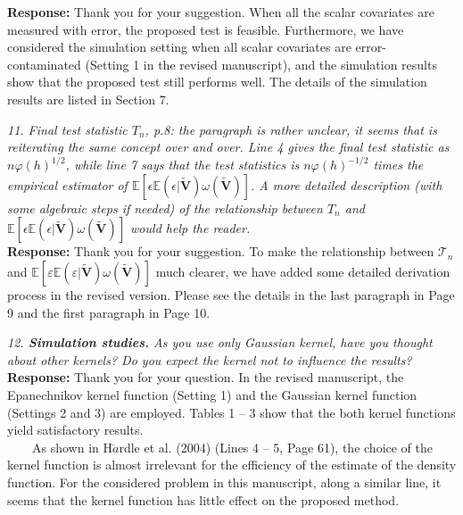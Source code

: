 \documentclass[12pt]{report}
\begin{document}
\begin{description}
{ \bf Response: }  Thank you for your suggestion.  When all the scalar covariates are measured with error, the proposed test is feasible.
Furthermore, we have considered the simulation setting when all scalar covariates are error-contaminated (Setting 1 in the revised manuscript), and the simulation results show that the proposed test still performs well.
The details of the simulation results are listed in Section 7.\\

\item {{ \textcolor[rgb]{0.00,0.50,1.00}{\em 11. Final test statistic $T_n$, p.8: the paragraph is rather unclear, it seems that is reiterating the
same concept over and over. Line 4 gives the final test statistic as $n \varphi(h)^{1/2}$, while line 7 says
that the test statistics is $n \varphi(h)^{-1/2}$ times the empirical estimator of $\mathbb{E}[\epsilon \mathbb{E}(\epsilon | \tilde{\mathbf{V}})\omega(\tilde{\mathbf{V}})]$. A more
detailed description (with some algebraic steps if needed) of the relationship between $T_n$ and $\mathbb{E}[\epsilon \mathbb{E}(\epsilon | \tilde{\mathbf{V}})\omega(\tilde{\mathbf{V}})]$ would help the reader. }}}\\

{ \bf Response: } Thank you for your suggestion. To make the relationship between ${\mathcal{T}}_n$ and $\mathbb{E}[\varepsilon \mathbb{E}(\varepsilon | \tilde{\mathbf{V}})\omega(\tilde{\mathbf{V}})]$ much clearer, we have added  some detailed derivation process in the revised version. Please see the details in the last paragraph in Page 9
and the first paragraph in Page 10.\\

\item {{ \textcolor[rgb]{0.00,0.50,1.00}{\em 12.  {\bf {Simulation studies.}} As you use only Gaussian kernel, have you thought about other kernels?
Do you expect the kernel not to influence the results?}}}\\

{ \bf Response: } Thank you for your question.  In the revised manuscript,  the Epanechnikov kernel function (Setting 1) and the
Gaussian kernel  function (Settings 2 and 3) are employed. Tables 1 -- 3 show that the both kernel functions yield satisfactory results. \\

\ \ \ \  As shown in H$\ddot{a}$rdle et al. (2004) (Lines 4 -- 5, Page 61), the choice of the kernel function is almost irrelevant for the efficiency of the estimate of the density function. For the considered problem in this manuscript, along a similar line, it seems that  the kernel function has little effect on the proposed method. \\


\end{description}
\end{document}
